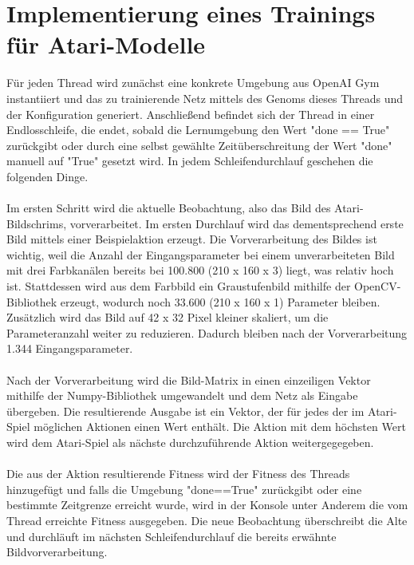 \section{Implementierung eines Trainings für Atari-Modelle}
Für jeden Thread wird zunächst eine konkrete Umgebung aus OpenAI Gym instantiiert und das zu trainierende Netz mittels des Genoms dieses Threads und der Konfiguration generiert. Anschließend befindet sich der Thread in einer Endlosschleife, die endet, sobald die Lernumgebung den Wert "done == True" zurückgibt oder durch eine selbst gewählte Zeitüberschreitung der Wert "done" manuell auf "True" gesetzt wird. In jedem Schleifendurchlauf geschehen die folgenden Dinge.
\\
\\
Im ersten Schritt wird die aktuelle Beobachtung, also das Bild des Atari-Bildschrims, vorverarbeitet. Im ersten Durchlauf wird das dementsprechend erste Bild mittels einer Beispielaktion erzeugt. Die Vorverarbeitung des Bildes ist wichtig, weil die Anzahl der Eingangsparameter bei einem unverarbeiteten Bild mit drei Farbkanälen bereits bei 100.800 (210 x 160 x 3) liegt, was relativ hoch ist. Stattdessen wird aus dem Farbbild ein Graustufenbild mithilfe der OpenCV-Bibliothek erzeugt, wodurch noch 33.600 (210 x 160 x 1) Parameter bleiben. Zusätzlich wird das Bild auf 42 x 32 Pixel kleiner skaliert, um die Parameteranzahl weiter zu reduzieren. Dadurch bleiben nach der Vorverarbeitung 1.344 Eingangsparameter.
\\
\\
Nach der Vorverarbeitung wird die Bild-Matrix in einen einzeiligen Vektor mithilfe der Numpy-Bibliothek umgewandelt und dem Netz als Eingabe übergeben. Die resultierende Ausgabe ist ein Vektor, der für jedes der im Atari-Spiel möglichen Aktionen einen Wert enthält. Die Aktion mit dem höchsten Wert wird dem Atari-Spiel als nächste durchzuführende Aktion weitergegegeben.
\\
\\
Die aus der Aktion resultierende Fitness wird der Fitness des Threads hinzugefügt und falls die Umgebung "done==True" zurückgibt oder eine bestimmte Zeitgrenze erreicht wurde, wird in der Konsole unter Anderem die vom Thread erreichte Fitness ausgegeben. Die neue Beobachtung überschreibt die Alte und durchläuft im nächsten Schleifendurchlauf die bereits erwähnte Bildvorverarbeitung.
